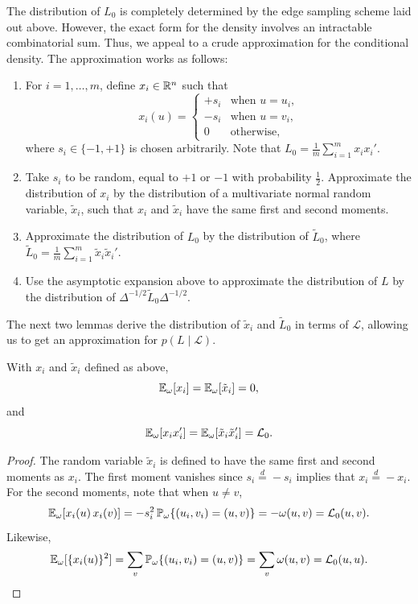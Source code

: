 The distribution of $L_0$ is completely determined by the edge
sampling scheme laid out above.  However, the exact form for the
density involves an intractable combinatorial sum.  
Thus, we appeal to a
crude approximation for the conditional density.
The approximation works as follows:
\begin{enumerate}
\item For $i = 1, \dotsc, m$, define $x_i \in \mathbb{R}^n$ such that
  \[
    x_i(u)
      =
      \begin{cases}
        +s_i &\text{when $u = u_i$,} \\
        -s_i &\text{when $u = v_i$,} \\
        0 &\text{otherwise,}
      \end{cases}
  \]
  where $s_i \in \{ -1, +1 \}$ is chosen arbitrarily.
  Note that $L_0 = \frac{1}{m} \sum_{i=1}^m x_i x_i'$.
\item Take $s_i$ to be random, equal to $+1$ or $-1$ with probability
  $\tfrac{1}{2}$.  Approximate the distribution of $x_i$ by the
  distribution of a multivariate normal random variable, $\tilde x_i$,
  such that $x_i$ and $\tilde x_i$ have the same first and second
  moments.
\item Approximate the distribution of $L_0$ by the distribution of $\tilde L_0$, where
  \(
  \tilde L_0 = \frac{1}{m} \sum_{i=1}^m \tilde x_i \tilde x_i'.
  \)
  \item Use the asymptotic expansion above to approximate the
    distribution of $L$ by the distribution of
    $\Delta^{-1/2} \tilde L_0 \Delta^{-1/2}$.
\end{enumerate}

\noindent
The next two lemmas derive the distribution of $\tilde x_i$ and
$\tilde L_0$ in terms of $\mathcal{L}$, allowing us to get an
approximation for $p(L \mid \mathcal{L})$.

\begin{lemma}
  With $x_i$ and $\tilde x_i$ defined as above,
  \[
    \mathbb{E}_\omega[ x_i ] = \mathbb{E}_\omega[ \tilde x_i ] = 0,
  \]
  and
  \[
    \mathbb{E}_\omega[ x_i x_i' ] = \mathbb{E}_\omega [ \tilde x_i \tilde x_i' ] = \mathcal{L}_0.
  \]
\end{lemma}
\begin{proof}
The random variable $\tilde x_i$ is defined to have the same first
and second moments as $x_i$.
The first moment vanishes since $s_i \overset{d}{=} -s_i$ implies
that $x_i \overset{d}{=} -x_i$.  For the second moments, note that
when $u \neq v$, 
\[
  \mathbb{E}_\omega[x_i(u) \, x_i(v)]
  = -s_i^2 \, \mathbb{P}_\omega\{ (u_i,v_i) = (u,v) \}  = -\omega(u,v)
  = \mathcal{L}_0(u,v).
\]
Likewise,
\[
  \mathbb{E}_\omega[\{x_i(u)\}^2]
      = \sum_{v} \mathbb{P}_\omega\{ (u_i,v_i) = (u,v) \}
      = \sum_{v} \omega(u,v)
      = \mathcal{L}_0(u,u). \qedhere
\]
\end{proof}

